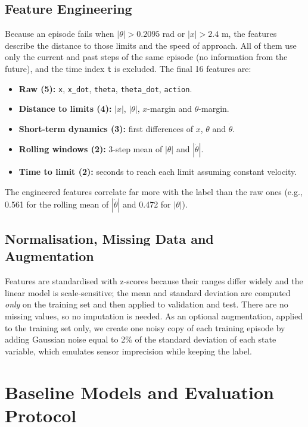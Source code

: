 \documentclass[conference]{IEEEtran}
\begin{document}
\subsection{Feature Engineering}
Because an episode fails when $|\theta|>0.2095$ rad or $|x|>2.4$ m, the features describe the
distance to those limits and the speed of approach. All of them use only the current and past
steps of the same episode (no information from the future), and the time index \texttt{t} is
excluded. The final 16 features are:
\begin{itemize}
\item \textbf{Raw (5):} \texttt{x}, \texttt{x\_dot}, \texttt{theta}, \texttt{theta\_dot}, \texttt{action}.
\item \textbf{Distance to limits (4):} $|x|$, $|\theta|$, $x$-margin and $\theta$-margin.
\item \textbf{Short-term dynamics (3):} first differences of $x$, $\theta$ and $\dot\theta$.
\item \textbf{Rolling windows (2):} 3-step mean of $|\theta|$ and $|\dot\theta|$.
\item \textbf{Time to limit (2):} seconds to reach each limit assuming constant velocity.
\end{itemize}
The engineered features correlate far more with the label than the raw ones
(e.g., 0.561 for the rolling mean of $|\dot\theta|$ and 0.472 for $|\theta|$).

\subsection{Normalisation, Missing Data and Augmentation}
Features are standardised with z-scores because their ranges differ widely and the linear
model is scale-sensitive; the mean and standard deviation are computed \emph{only} on the
training set and then applied to validation and test. There are no missing values, so no
imputation is needed. As an optional augmentation, applied to the training set only,
we create one noisy copy of each training episode by adding Gaussian noise equal to 2\% of
the standard deviation of each state variable, which emulates sensor imprecision while
keeping the label.

\section{Baseline Models and Evaluation Protocol}
\end{document}
